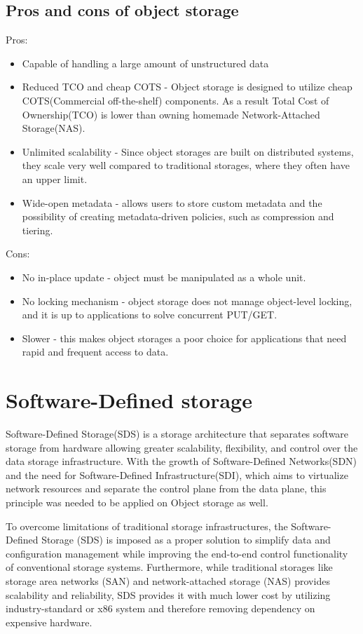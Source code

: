     \subsection*{Pros and cons of object storage}
    Pros:
    \begin{itemize}
        \item Capable of handling a large amount of unstructured data
        \item Reduced TCO and cheap COTS - Object storage is designed to utilize cheap COTS(Commercial off-the-shelf) components. As a result Total Cost of Ownership(TCO) is lower than owning homemade Network-Attached Storage(NAS)\cite{networkStorage}.
        \item Unlimited scalability - Since object storages are built on distributed systems, they scale very well compared to traditional storages, where they often have an upper limit\cite{swiftEssentials}.
        \item Wide-open metadata - allows users to store custom metadata and the possibility of creating metadata-driven policies, such as compression and tiering.
    \end{itemize}
    Cons:
    \begin{itemize}
        \item No in-place update - object must be manipulated as a whole unit.
        \item No locking mechanism - object storage does not manage object-level locking, and it is up to applications to solve concurrent PUT/GET.
        \item Slower - this makes object storages a poor choice for applications that need rapid and frequent access to data.
    \end{itemize}

\section{Software-Defined storage}
    Software-Defined Storage(SDS) is a storage architecture that separates software storage from hardware allowing greater scalability, flexibility, and control over the data storage infrastructure. With the growth of Software-Defined Networks(SDN) and the need for Software-Defined Infrastructure(SDI), which aims to virtualize network resources and separate the control plane from the data plane, this principle was needed to be applied on Object storage as well\cite{sdsSDSMultiTenantEnv}.

    To overcome limitations of traditional storage infrastructures, the Software-Defined Storage (SDS) is imposed as a proper solution to simplify data and configuration management while improving the end-to-end control functionality of conventional storage systems\cite{sdsSurvey}. Furthermore, while traditional storages like storage area networks (SAN) and network-attached storage (NAS) provides scalability and reliability, SDS provides it with much lower cost by utilizing industry-standard or x86 system and therefore removing dependency on expensive hardware\cite{sdsWPRedHatSDS}.

